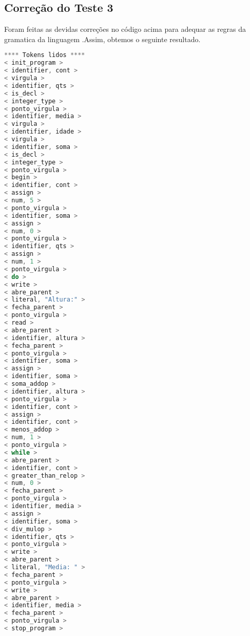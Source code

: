 \subsection{Correção do Teste 3}
Foram feitas as devidas correções no código acima para adequar as regras da gramatica da linguagem .Assim, obtemos o seguinte resultado.


\begin{lstlisting}[caption={Saida Correta para o Codigo de teste  : Teste3.txt},label={Entrada 1},language=C]
**** Tokens lidos ****
< init_program >
< identifier, cont >
< virgula >
< identifier, qts >
< is_decl >
< integer_type >
< ponto_virgula >
< identifier, media >
< virgula >
< identifier, idade >
< virgula >
< identifier, soma >
< is_decl >
< integer_type >
< ponto_virgula >
< begin >
< identifier, cont >
< assign >
< num, 5 >
< ponto_virgula >
< identifier, soma >
< assign >
< num, 0 >
< ponto_virgula >
< identifier, qts >
< assign >
< num, 1 >
< ponto_virgula >
< do >
< write >
< abre_parent >
< literal, "Altura:" >
< fecha_parent >
< ponto_virgula >
< read >
< abre_parent >
< identifier, altura >
< fecha_parent >
< ponto_virgula >
< identifier, soma >
< assign >
< identifier, soma >
< soma_addop >
< identifier, altura >
< ponto_virgula >
< identifier, cont >
< assign >
< identifier, cont >
< menos_addop >
< num, 1 >
< ponto_virgula >
< while >
< abre_parent >
< identifier, cont >
< greater_than_relop >
< num, 0 >
< fecha_parent >
< ponto_virgula >
< identifier, media >
< assign >
< identifier, soma >
< div_mulop >
< identifier, qts >
< ponto_virgula >
< write >
< abre_parent >
< literal, "Media: " >
< fecha_parent >
< ponto_virgula >
< write >
< abre_parent >
< identifier, media >
< fecha_parent >
< ponto_virgula >
< stop_program >




\end{lstlisting}
